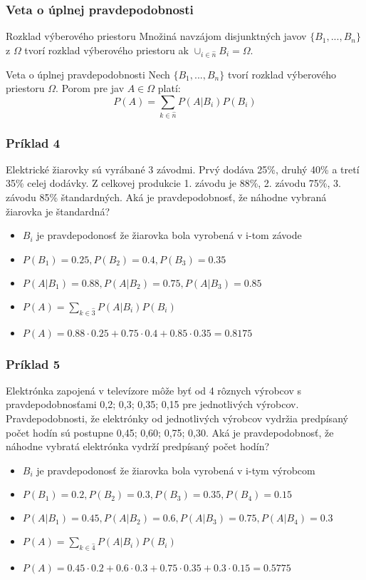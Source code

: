 \documentclass{beamer}
\begin{document}
\begin{frame}
\frametitle{Veta o úplnej pravdepodobnosti}

\begin{block}{Rozklad výberového priestoru}
Množiná navzájom disjunktných javov $\{B_1, ..., B_n\}$ z $\Omega$ tvorí rozklad výberového priestoru ak $\cup_{i \in \hat{n}} B_i = \Omega$.
\end{block}

\begin{block}{Veta o úplnej pravdepodobnosti}
Nech  $\{B_1, ..., B_n\}$ tvorí rozklad výberového priestoru $\Omega$. Porom pre jav $A \in \Omega$ platí:
\begin{equation*}
P(A) = \sum_{k \in \hat{n}} P(A|B_i)P(B_i)
\end{equation*}
\end{block}
\end{frame}

\begin{frame}
\frametitle{Príklad 4}
Elektrické žiarovky sú vyrábané 3 závodmi. Prvý dodáva 25\%, druhý 40\% a tretí 35\% celej dodávky. Z celkovej produkcie 1. závodu je 88\%, 2. závodu 75\%, 3. závodu 85\% štandardných. Aká je pravdepodobnosť, že náhodne vybraná žiarovka je štandardná?

\begin{itemize}
\item<2-> $B_i$ je pravdepodonosť že žiarovka bola vyrobená v i-tom závode \\
\item<3-> $P(B_1) = 0.25, P(B_2) = 0.4, P(B_3) = 0.35$
\item<4-> $P(A | B_1) = 0.88, P(A | B_2) = 0.75, P(A | B_3) = 0.85$
\item<5-> $P(A) = \sum_{k \in \hat{3}} P(A|B_i)P(B_i)$
\item<6-> $P(A) = 0.88 \cdot 0.25 + 0.75 \cdot 0.4 + 0.85 \cdot 0.35 = 0.8175$ 
\end{itemize}
\end{frame}

\begin{frame}
\frametitle{Príklad 5}
Elektrónka zapojená v televízore môže byť od 4 rôznych výrobcov s pravdepodobnosťami 0,2; 0,3; 0,35; 0,15 pre jednotlivých výrobcov. Pravdepodobnosti, že elektrónky od jednotlivých výrobcov vydržia predpísaný počet hodín sú postupne 0,45; 0,60; 0,75; 0,30. Aká je pravdepodobnosť, že náhodne vybratá elektrónka vydrží predpísaný počet hodín?

\begin{itemize}
\item<2-> $B_i$ je pravdepodonosť že žiarovka bola vyrobená v i-tym výrobcom \\
\item<3-> $P(B_1) = 0.2, P(B_2) = 0.3, P(B_3) = 0.35, P(B_4) = 0.15$
\item<4-> $P(A | B_1) = 0.45, P(A | B_2) = 0.6, P(A | B_3) = 0.75, P(A | B_4) = 0.3$
\item<5-> $P(A) = \sum_{k \in \hat{4}} P(A|B_i)P(B_i)$
\item<6-> $P(A) = 0.45 \cdot 0.2 + 0.6 \cdot 0.3 + 0.75 \cdot 0.35 +  0.3 \cdot 0.15= 0.5775$ 
\end{itemize}
\end{frame}
\end{document}
